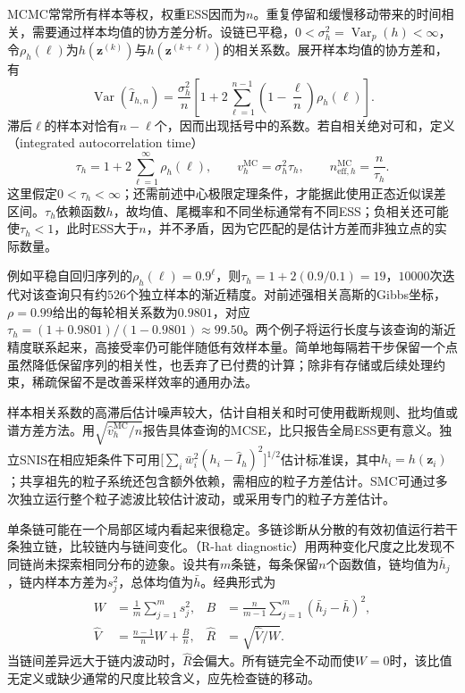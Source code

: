 MCMC常常所有样本等权，权重ESS因而为$n$。重复停留和缓慢移动带来的时间相关，需要通过样本均值的协方差分析。设链已平稳，$0<\sigma_h^2=\operatorname{Var}_p(h)<\infty$，令$\rho_h(\ell)$为$h(\bm{z}^{(k)})$与$h(\bm{z}^{(k+\ell)})$的相关系数。展开样本均值的协方差和，有
\begin{equation}
  \operatorname{Var}(\widehat I_{h,n})
    =\frac{\sigma_h^2}{n}
      \left[1+2\sum_{\ell=1}^{n-1}
          \left(1-\frac{\ell}{n}\right)\rho_h(\ell)\right].
  \label{eq:pgm-sampling-autocorrelation-variance}
\end{equation}
滞后$\ell$的样本对恰有$n-\ell$个，因而出现括号中的系数。若自相关绝对可和，定义（integrated autocorrelation time）
\begin{equation}
  \tau_h=1+2\sum_{\ell=1}^{\infty}\rho_h(\ell),\qquad
  v_h^{\mathrm{MC}}=\sigma_h^2\tau_h,\qquad
  n_{\mathrm{eff},h}^{\mathrm{MC}}=\frac{n}{\tau_h}.
  \label{eq:pgm-sampling-mcmc-ess}
\end{equation}
这里假定$0<\tau_h<\infty$；还需前述中心极限定理条件，才能据此使用正态近似误差区间。$\tau_h$依赖函数$h$，故均值、尾概率和不同坐标通常有不同ESS；负相关还可能使$\tau_h<1$，此时ESS大于$n$，并不矛盾，因为它匹配的是估计方差而非独立点的实际数量。

例如平稳自回归序列的$\rho_h(\ell)=0.9^\ell$，则$\tau_h=1+2(0.9/0.1)=19$，$10000$次迭代对该查询只有约$526$个独立样本的渐近精度。对前述强相关高斯的Gibbs坐标，$\rho=0.99$给出的每轮相关系数为$0.9801$，对应$\tau_h=(1+0.9801)/(1-0.9801)\approx99.50$。两个例子将运行长度与该查询的渐近精度联系起来，高接受率仍可能伴随低有效样本量。简单地每隔若干步保留一个点虽然降低保留序列的相关性，也丢弃了已付费的计算；除非有存储或后续处理约束，稀疏保留不是改善采样效率的通用办法。

样本相关系数的高滞后估计噪声较大，估计自相关和时可使用截断规则、批均值或谱方差方法。用$\sqrt{\widehat v_h^{\mathrm{MC}}/n}$报告具体查询的MCSE，比只报告全局ESS更有意义。独立SNIS在相应矩条件下可用$\bigl[\sum_i\bar w_i^2(h_i-\widehat I_h)^2\bigr]^{1/2}$估计标准误，其中$h_i=h(\bm{z}_i)$；共享祖先的粒子系统还包含额外依赖，需相应的粒子方差估计。SMC可通过多次独立运行整个粒子滤波比较估计波动，或采用专门的粒子方差估计。

单条链可能在一个局部区域内看起来很稳定。多链诊断从分散的有效初值运行若干条独立链，比较链内与链间变化。（R-hat diagnostic）用两种变化尺度之比发现不同链尚未探索相同分布的迹象。设共有$m$条链，每条保留$n$个函数值，链均值为$\bar h_j$，链内样本方差为$s_j^2$，总体均值为$\bar h$。经典形式为
\begin{equation}
  \begin{aligned}
    W&=\frac1m\sum_{j=1}^{m}s_j^2,&
    B&=\frac{n}{m-1}\sum_{j=1}^{m}(\bar h_j-\bar h)^2,\\
    \widehat V&=\frac{n-1}{n}W+\frac{B}{n},&
    \widehat R&=\sqrt{\widehat V/W}.
  \end{aligned}
  \label{eq:pgm-sampling-rhat}
\end{equation}
当链间差异远大于链内波动时，$\widehat R$会偏大。所有链完全不动而使$W=0$时，该比值无定义或缺少通常的尺度比较含义，应先检查链的移动。

